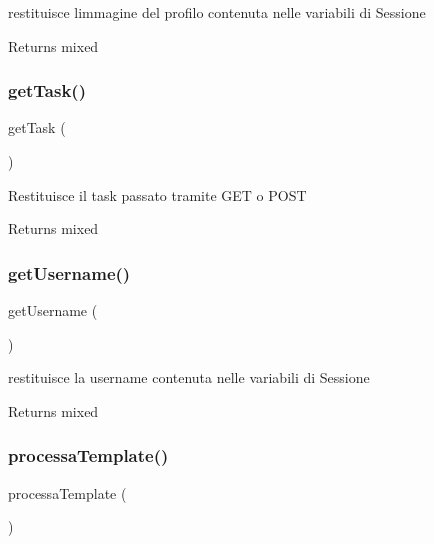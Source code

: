 restituisce l\textquotesingle{}immagine del profilo contenuta nelle variabili di Sessione

\begin{DoxyReturn}{Returns}
mixed 
\end{DoxyReturn}
\mbox{\label{class_v_utente_a13871c4434338f02d6f8d430fa0597f2}} 
\subsubsection{\texorpdfstring{get\+Task()}{getTask()}}
{\footnotesize\ttfamily get\+Task (\begin{DoxyParamCaption}{ }\end{DoxyParamCaption})}

Restituisce il task passato tramite G\+ET o P\+O\+ST

\begin{DoxyReturn}{Returns}
mixed 
\end{DoxyReturn}
\mbox{\label{class_v_utente_a81b37a3c9d639574e394f80c1138c75e}} 
\subsubsection{\texorpdfstring{get\+Username()}{getUsername()}}
{\footnotesize\ttfamily get\+Username (\begin{DoxyParamCaption}{ }\end{DoxyParamCaption})}

restituisce la username contenuta nelle variabili di Sessione

\begin{DoxyReturn}{Returns}
mixed 
\end{DoxyReturn}
\mbox{\label{class_v_utente_a64bdc484fc7074989b4b2c0ebc63aec2}} 
\subsubsection{\texorpdfstring{processa\+Template()}{processaTemplate()}}
{\footnotesize\ttfamily processa\+Template (\begin{DoxyParamCaption}{ }\end{DoxyParamCaption})}

